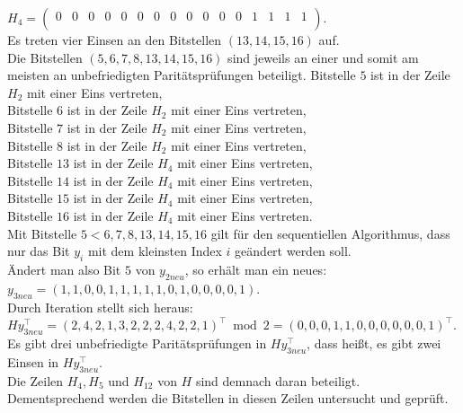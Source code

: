 \begin{Beispiel}
    $H_4= \left( \begin{array}{rrrrrrrrrrrrrrrr}
        0 & 0 & 0 & 0 & 0 & 0 & 0 & 0 & 0 & 0 & 0 & 0 & 1 & 1 & 1 & 1 \\
       \end{array}\right). 
    $\\
    Es treten vier Einsen an den Bitstellen $(13, 14, 15, 16)$ auf.\\
    
    Die Bitstellen $(5, 6, 7, 8, 13, 14, 15, 16)$ sind jeweils an einer und somit am meisten an unbefriedigten Paritätsprüfungen beteiligt.
    Bitstelle $5$ ist in der Zeile $H_2$ mit einer Eins vertreten,\\
    Bitstelle $6$ ist in der Zeile $H_2$ mit einer Eins vertreten,\\
    Bitstelle $7$ ist in der Zeile $H_2$ mit einer Eins vertreten,\\
    Bitstelle $8$ ist in der Zeile $H_2$ mit einer Eins vertreten,\\
    Bitstelle $13$ ist in der Zeile $H_4$ mit einer Eins vertreten,\\
    Bitstelle $14$ ist in der Zeile $H_4$ mit einer Eins vertreten,\\
    Bitstelle $15$ ist in der Zeile $H_4$ mit einer Eins vertreten,\\
    Bitstelle $16$ ist in der Zeile $H_4$ mit einer Eins vertreten.\\
    Mit Bitstelle $5 < 6, 7, 8, 13, 14, 15, 16$ gilt für den sequentiellen Algorithmus, dass nur das Bit $y_i$ mit dem kleinsten Index $i$ geändert werden soll.\\
    
    Ändert man also Bit $5$ von $y_{2neu}$, so erhält man ein neues:\\
    $y_{3neu} = (1,1,0,0,1,1,1,1,1,0,1,0,0,0,0,1).$\\
    
    Durch Iteration stellt sich heraus:\\
    $Hy_{3neu}^\intercal = (2,4,2,1,3,2,2,2,4,2,2,1)^\intercal \bmod 2 = (0,0,0,1,1,0,0,0,0,0,0,1)^\intercal$.\\
    
    Es gibt drei unbefriedigte Paritätsprüfungen in $Hy_{3neu}^\intercal$, 
    dass hei\ss{}t, es gibt zwei Einsen in $Hy_{3neu}^\intercal.$\\
    Die Zeilen $H_4, H_5$ und $H_{12}$ von $H$ sind demnach daran beteiligt.\\ 
    Dementsprechend werden die Bitstellen in diesen Zeilen untersucht und geprüft.\\
    

\end{Beispiel}
